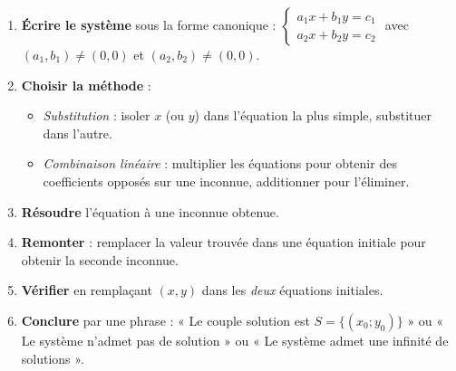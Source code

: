 \documentclass[11pt]{article}
\begin{document}
\begin{methode}
\begin{enumerate}
\item \textbf{Écrire le système} sous la forme canonique :
      $\begin{cases} a_1 x + b_1 y = c_1 \\ a_2 x + b_2 y = c_2 \end{cases}$ avec $(a_1,b_1)\neq(0,0)$ et $(a_2,b_2)\neq(0,0)$.
\item \textbf{Choisir la méthode} :
      \begin{itemize}
      \item \emph{Substitution} : isoler $x$ (ou $y$) dans l'équation la plus simple, substituer dans l'autre.
      \item \emph{Combinaison linéaire} : multiplier les équations pour obtenir des coefficients opposés sur une inconnue, additionner pour l'éliminer.
      \end{itemize}
\item \textbf{Résoudre} l'équation à une inconnue obtenue.
\item \textbf{Remonter} : remplacer la valeur trouvée dans une équation initiale pour obtenir la seconde inconnue.
\item \textbf{Vérifier} en remplaçant $(x,y)$ dans les \emph{deux} équations initiales.
\item \textbf{Conclure} par une phrase : « Le couple solution est $S = \{(x_0;y_0)\}$ » ou « Le système n'admet pas de solution » ou « Le système admet une infinité de solutions ».
\end{enumerate}
\end{methode}
\end{document}

